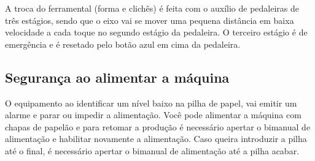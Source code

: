 A troca do ferramental (forma e clichês) é feita com o auxílio de pedaleiras de três estágios, sendo que o eixo vai se mover uma pequena distância em baixa velocidade a 
cada toque no segundo estágio da pedaleira. O terceiro estágio é de emergência e é resetado pelo botão azul em cima da pedaleira.

\subsection{Segurança ao alimentar a máquina}

O equipamento ao identificar um nível baixo na pilha de papel, vai emitir um alarme e parar ou impedir a alimentação. Você pode alimentar a máquina com chapas de papelão
e para retomar a produção é necessário apertar o bimanual de alimentação e habilitar novamente a alimentação. Caso queira introduzir a pilha até o final, é necessário
apertar o bimanual de alimentação até a pilha acabar.


